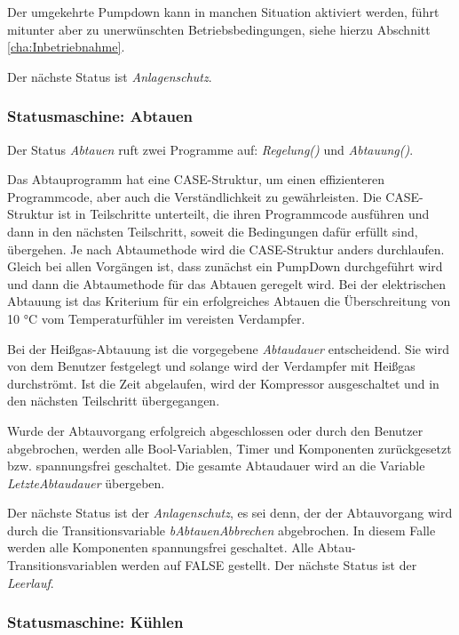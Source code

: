 Der umgekehrte Pumpdown kann in manchen Situation aktiviert werden, führt mitunter aber zu unerwünschten Betriebsbedingungen, siehe hierzu Abschnitt \ref{cha:Inbetriebnahme}. 

Der nächste Status ist \textit{Anlagenschutz}.

\subsubsection*{Statusmaschine: Abtauen}

Der Status \textit{Abtauen} ruft zwei Programme auf:\textit{ Regelung()} und \textit{Abtauung()}. 

Das Abtauprogramm hat eine CASE-Struktur, um einen effizienteren Programmcode, aber auch die Verständlichkeit zu gewährleisten. Die CASE-Struktur ist in Teilschritte unterteilt, die ihren Programmcode ausführen und dann in den nächsten Teilschritt, soweit die Bedingungen dafür erfüllt sind,  übergehen. Je nach Abtaumethode wird die CASE-Struktur anders durchlaufen. Gleich  bei allen Vorgängen ist, dass zunächst ein PumpDown durchgeführt wird und dann die Abtaumethode für das Abtauen geregelt wird. Bei der elektrischen Abtauung ist das Kriterium für ein erfolgreiches Abtauen die Überschreitung von 10 °C vom Temperaturfühler im vereisten Verdampfer. 

Bei der Heißgas-Abtauung ist die vorgegebene \textit{Abtaudauer} entscheidend. Sie wird von dem Benutzer festgelegt und solange wird der Verdampfer mit Heißgas durchströmt. Ist die Zeit abgelaufen, wird der Kompressor ausgeschaltet und in den nächsten Teilschritt übergegangen. 

Wurde der Abtauvorgang erfolgreich abgeschlossen oder durch den Benutzer abgebrochen, werden alle Bool-Variablen, Timer und Komponenten zurückgesetzt bzw. spannungsfrei geschaltet. Die gesamte Abtaudauer wird an die Variable \textit{LetzteAbtaudauer} übergeben. 


Der nächste Status ist der \textit{Anlagenschutz}, es sei denn, der der Abtauvorgang wird durch die Transitionsvariable \textit{bAbtauenAbbrechen} abgebrochen. In diesem Falle werden alle Komponenten spannungsfrei geschaltet. Alle Abtau-Transitionsvariablen werden auf FALSE gestellt. Der nächste Status ist der \textit{Leerlauf}. 

\subsubsection*{Statusmaschine: Kühlen}


